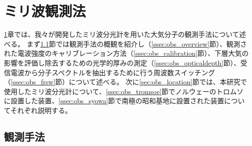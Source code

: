 \chapter{ミリ波観測法}
\label{ch:mm_obs}
\ref{ch:mm_obs}章では、我々が開発したミリ波分光計を用いた大気分子の観測手法について述べる。
まず\ref{sec:obs_method}節では観測手法の概観を紹介し（\ref{ssec:obs_overview}節）、観測された電波強度のキャリブレーション方法（\ref{ssec:obs_calibration}節）、下層大気の影響を評価し除去するための光学的厚みの測定（\ref{ssec:obs_opticaldepth}節）、受信電波から分子スペクトルを抽出するために行う周波数スイッチング（\ref{ssec:obs_frsw}節）について述べる。
次に\ref{sec:obs_location}節では、本研究で使用したミリ波分光計について、\ref{ssec:obs_tromsoe}節でノルウェーのトロムソに設置した装置、\ref{ssec:obs_syowa}節で南極の昭和基地に設置された装置についてそれぞれ説明する。


\section{観測手法}
\label{sec:obs_method}
